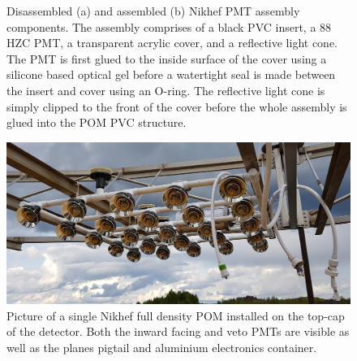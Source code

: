 \begin{figure} %
    \centering
    \quad
    \caption[Disassembled and assembled Nikhef PMT housing components.]
    {Disassembled (a) and assembled (b) Nikhef PMT assembly components. The assembly comprises of
        a black PVC insert, a \unit{88}{} HZC PMT, a transparent acrylic cover, and a
        reflective light cone. The PMT is first glued to the inside surface of the cover using a
        silicone based optical gel before a watertight seal is made between the insert and cover
        using an O-ring. The reflective light cone is simply clipped to the front of the cover
        before the whole assembly is glued into the POM PVC structure.}
    \label{fig:pmt_assembly}
\end{figure}

\begin{figure} %
    \includegraphics[width=\textwidth]{diagrams/4-chips/single_plane.jpg}
    \caption[Picture of a Nikhef POM.]
    {Picture of a single Nikhef full density POM installed on the top-cap of the \chipsfive
        detector. Both the inward facing and veto PMTs are visible as well as the planes pigtail
        and aluminium electronics container.}
    \label{fig:single_plane}
\end{figure}

